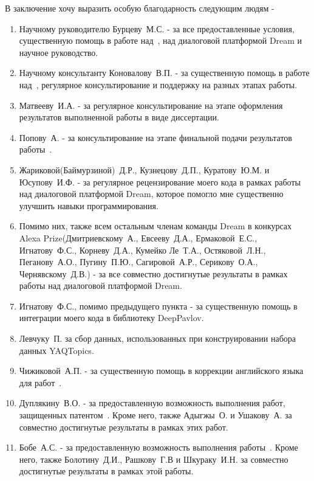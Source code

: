 В заключение хочу выразить особую благодарность следующим людям - 
\begin{enumerate}
\item Научному руководителю Бурцеву~М.\:С. - за все предоставленные условия, существенную помощь в работе над~\cite{dream1,dream1_trudy,dream2,pseudolabel,mtldream}, над диалоговой платформой Dream и научное руководство.
\item Научному консультанту Коновалову~В.\:П. - за существенную помощь в работе над~\cite{rumtl,rutopics}, регулярное консультирование и поддержку на разных этапах работы.
\item Матвееву~И.\:А. - за регулярное консультирование на этапе оформления результатов выполненной работы в виде диссертации.
\item Попову~А. - за консультирование на этапе финальной подачи результатов работы~\cite{rutopics}.
\item Жариковой(Баймурзиной)~Д.\:Р., Кузнецову~Д.\:П., Куратову~Ю.\:М. и Юсупову~И.\:Ф. - за регулярное рецензирование моего кода в рамках работы над диалоговой платформой Dream, которое помогло мне существенно улучшить навыки программирования.
\item Помимо них, также всем остальным членам команды Dream в конкурсах Alexa Prize(Дмитриевскому~А., Евсееву~Д.\:А., Ермаковой~Е.\:С., Игнатову~Ф.\:С., Корневу~Д.\:А., Кумейко Ле~Т.\:А., Остяковой~Л.\:Н., Пеганову~А.\:О., Пугину~П.\:Ю., Сагировой~А.\:Р., Серикову~О.\:А., Чернявскому~Д.\:В.) - за все совместно достигнутые результаты в рамках работы над диалоговой платформой Dream.
\item Игнатову~Ф.\:С., помимо предыдущего пункта - за существенную помощь в интеграции моего кода в библиотеку DeepPavlov.
\item Левчуку~П. за сбор данных, использованных при конструировании набора данных YAQTopics.
\item Чижиковой~А.\:П. - за существенную помощь в коррекции английского языка для работ~\cite{rumtl,rutopics}.
\item Дуплякину~В.\:О. - за предоставленную возможность выполнения работ, защищенных патентом~\cite{Дуплякин_Дмитрий_Ондар_Ушаков_2021}. Кроме него, также Адыгжы~\:О. и Ушакову~\:А. за совместно достигнутые результаты в рамках этих работ. 
\item Бобе~А.\:С. - за предоставленную возможность выполнения работы~\cite{Болотин_Карпов_Рашков_Шкурак_2019}. Кроме него, также Болотину~Д.\:И., Рашкову~Г.\:В и Шкураку~И.\:Н. за совместно достигнутые результаты в рамках этой работы. 

\end{enumerate}
